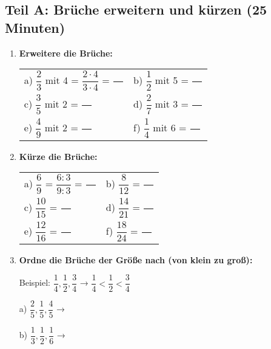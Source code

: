 \subsection*{Teil A: Brüche erweitern und kürzen (25 Minuten)}

\begin{enumerate}[label=\arabic*.]
    \item \textbf{Erweitere die Brüche:}
    \vspace{0.5cm}

    \begin{tabular}{ll}
        a) $\dfrac{2}{3}$ mit 4 = $\dfrac{2 \cdot 4}{3 \cdot 4}$ = $\dfrac{\phantom{00}}{\phantom{00}}$ & b) $\dfrac{1}{2}$ mit 5 = $\dfrac{\phantom{00}}{\phantom{00}}$ \\[4ex]
        c) $\dfrac{3}{5}$ mit 2 = $\dfrac{\phantom{00}}{\phantom{00}}$ & d) $\dfrac{2}{7}$ mit 3 = $\dfrac{\phantom{00}}{\phantom{00}}$ \\[4ex]
        e) $\dfrac{4}{9}$ mit 2 = $\dfrac{\phantom{00}}{\phantom{00}}$ & f) $\dfrac{1}{4}$ mit 6 = $\dfrac{\phantom{00}}{\phantom{00}}$
    \end{tabular}

    \vspace{1cm}

    \item \textbf{Kürze die Brüche:}
    \vspace{0.5cm}

    \begin{tabular}{ll}
        a) $\dfrac{6}{9}$ = $\dfrac{6 : 3}{9 : 3}$ = $\dfrac{\phantom{00}}{\phantom{00}}$ & b) $\dfrac{8}{12}$ = $\dfrac{\phantom{00}}{\phantom{00}}$ \\[4ex]
        c) $\dfrac{10}{15}$ = $\dfrac{\phantom{00}}{\phantom{00}}$ & d) $\dfrac{14}{21}$ = $\dfrac{\phantom{00}}{\phantom{00}}$ \\[4ex]
        e) $\dfrac{12}{16}$ = $\dfrac{\phantom{00}}{\phantom{00}}$ & f) $\dfrac{18}{24}$ = $\dfrac{\phantom{00}}{\phantom{00}}$
    \end{tabular}

    \vspace{1cm}

    \item \textbf{Ordne die Brüche der Größe nach (von klein zu groß):}
    \vspace{0.5cm}

    Beispiel: $\dfrac{1}{4}, \dfrac{1}{2}, \dfrac{3}{4}$ → $\dfrac{1}{4} < \dfrac{1}{2} < \dfrac{3}{4}$

    a) $\dfrac{2}{5}, \dfrac{1}{5}, \dfrac{4}{5}$ → \underline{\hspace{5cm}}

    b) $\dfrac{1}{3}, \dfrac{1}{2}, \dfrac{1}{6}$ → \underline{\hspace{5cm}}

\end{enumerate}
